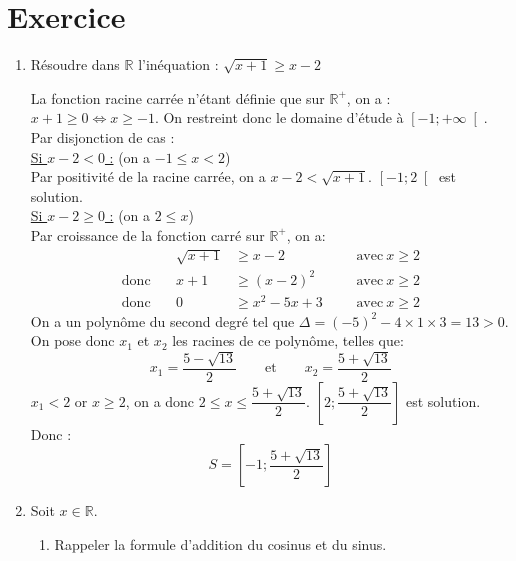 \documentclass[a4paper,french,bookmarks]{article}
\begin{document}
\section*{Exercice}

\begin{enumerate}
  \item
   Résoudre dans $\mathbb{R}$ l'inéquation : \quad $\sqrt{x+1} \geq x - 2$
   \begin{enumerate}

   \begin{tcolorbox}[colback=black!3,colframe=black!9,boxrule=.25pt,enhanced,arc is angular,arc=0pt]
   La fonction racine carrée n'étant définie que sur $\mathbb{R}^+$, on a : $x + 1 \geq 0 \iff x \geq -1$.\newline
   On restreint donc le domaine d'étude à $\left[-1;+\infty\right[$. Par disjonction de cas :\\
   
   \underline{Si $x - 2 < 0$ :} (on a $-1 \leq x < 2$)\\
   Par positivité de la racine carrée, on a $x - 2 < \sqrt{x + 1}$. $\left[-1;2\right[$ est solution.\\
   
   \underline{Si $x - 2 \geq 0$ :} (on a $2 \leq x$)\\
   Par croissance de la fonction carré sur $\mathbb{R}^+$, on a:
   \begin{align*}
    &&\sqrt{x+1} &\geq x - 2 && &\text{avec} \ x \geq 2\\
    \text{donc} \ && x+1 &\geq \left(x - 2\right)^2  && &\text{avec} \ x \geq 2\\
    \text{donc} \ && 0 &\geq x^2 - 5x + 3 && &\text{avec} \ x \geq 2
    \end{align*}
    On a un polynôme du second degré tel que $\Delta = (-5)^2 - 4\times1\times3 = 13 > 0$.\\
    On pose donc $x_1$ et $x_2$ les racines de ce polynôme, telles que:\\
    \[ x_1 = \dfrac{5 - \sqrt{13}}{2} \qquad \text{et} \qquad x_2 = \dfrac{5 + \sqrt{13}}{2}\]
    $x_1 < 2$ or $x \geq 2$, on a donc $2 \leq x \leq \dfrac{5 + \sqrt{13}}{2}$.
    $\left[2;\dfrac{5 + \sqrt{13}}{2}\right]$ est solution. Donc :\\
    
    \[S = \left[ -1 ; \dfrac{5 + \sqrt{13}}{2}\right] \]
    \end{tcolorbox}
   \end{enumerate}
  \item
    Soit $x \in \mathbb{R}$.
    \begin{enumerate}
        \item Rappeler la formule d'addition du cosinus et du sinus.
        

\end{enumerate}
\end{enumerate}
\end{document}
